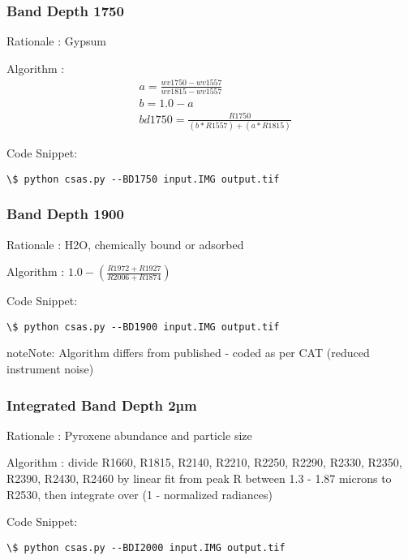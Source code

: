 \documentclass[letterpaper,10pt,english]{sphinxmanual}
\begin{document}
\subsubsection{Band Depth 1750}
\label{Algorithms:band-depth-1750}
Rationale : Gypsum

Algorithm : $$\begin{aligned}
& a = \frac{wv1750 - wv1557}{wv1815 - wv1557} \nonumber\\
& b = 1.0 - a \nonumber\\
& bd1750 = \frac{R1750}{(b*R1557)+(a*R1815)}
\end{aligned}$$

Code Snippet:

\begin{Verbatim}[commandchars=\\\{\}]
\$ python csas.py --BD1750 input.IMG output.tif
\end{Verbatim}


\subsubsection{Band Depth 1900}
\label{Algorithms:band-depth-1900}
Rationale : H2O, chemically bound or adsorbed

Algorithm : $1.0 - (\frac{R1972 + R1927}{R2006 + R1874})$

Code Snippet:

\begin{Verbatim}[commandchars=\\\{\}]
\$ python csas.py --BD1900 input.IMG output.tif
\end{Verbatim}

\begin{notice}{note}{Note:}
Algorithm differs from published - coded as per CAT (reduced instrument noise)
\end{notice}


\subsubsection{Integrated Band Depth 2µm}
\label{Algorithms:integrated-band-depth-2m}
Rationale : Pyroxene abundance and particle size

Algorithm : divide R1660, R1815, R2140, R2210, R2250, R2290, R2330, R2350, R2390, R2430, R2460 by linear fit from peak R between 1.3 - 1.87 microns to R2530, then integrate over (1 -  normalized radiances)

Code Snippet:

\begin{Verbatim}[commandchars=\\\{\}]
\$ python csas.py --BDI2000 input.IMG output.tif
\end{Verbatim}
\end{document}
